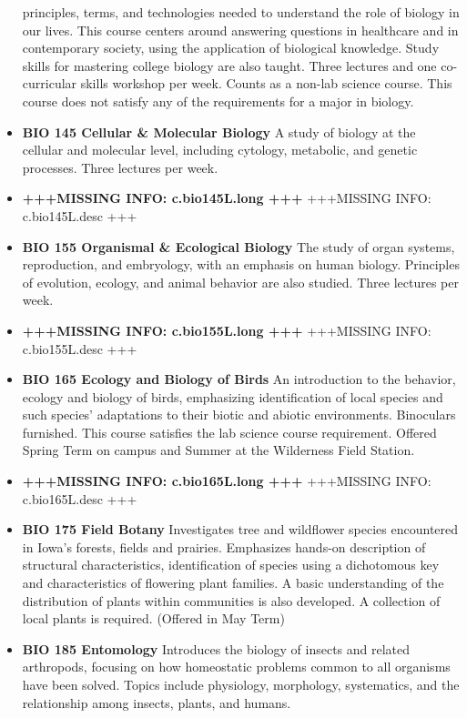 \documentclass[
  letterpaper,
]{scrbook}
\begin{document}
\begin{itemize}
  principles, terms, and technologies needed to understand the role of
  biology in our lives. This course centers around answering questions
  in healthcare and in contemporary society, using the application of
  biological knowledge. Study skills for mastering college biology are
  also taught. Three lectures and one co-curricular skills workshop per
  week. Counts as a non-lab science course. This course does not satisfy
  any of the requirements for a major in biology.
\item
  \textbf{BIO 145 Cellular \& Molecular Biology} A study of biology at
  the cellular and molecular level, including cytology, metabolic, and
  genetic processes. Three lectures per week.
\item
  \textbf{+++MISSING INFO: c.bio145L.long +++} +++MISSING INFO:
  c.bio145L.desc +++
\item
  \textbf{BIO 155 Organismal \& Ecological Biology} The study of organ
  systems, reproduction, and embryology, with an emphasis on human
  biology. Principles of evolution, ecology, and animal behavior are
  also studied. Three lectures per week.
\item
  \textbf{+++MISSING INFO: c.bio155L.long +++} +++MISSING INFO:
  c.bio155L.desc +++
\item
  \textbf{BIO 165 Ecology and Biology of Birds} An introduction to the
  behavior, ecology and biology of birds, emphasizing identification of
  local species and such species' adaptations to their biotic and
  abiotic environments. Binoculars furnished. This course satisfies the
  lab science course requirement. Offered Spring Term on campus and
  Summer at the Wilderness Field Station.
\item
  \textbf{+++MISSING INFO: c.bio165L.long +++} +++MISSING INFO:
  c.bio165L.desc +++
\item
  \textbf{BIO 175 Field Botany} Investigates tree and wildflower species
  encountered in Iowa's forests, fields and prairies. Emphasizes
  hands-on description of structural characteristics, identification of
  species using a dichotomous key and characteristics of flowering plant
  families. A basic understanding of the distribution of plants within
  communities is also developed. A collection of local plants is
  required. (Offered in May Term)
\item
  \textbf{BIO 185 Entomology} Introduces the biology of insects and
  related arthropods, focusing on how homeostatic problems common to all
  organisms have been solved. Topics include physiology, morphology,
  systematics, and the relationship among insects, plants, and humans.

\end{itemize}
\end{document}
